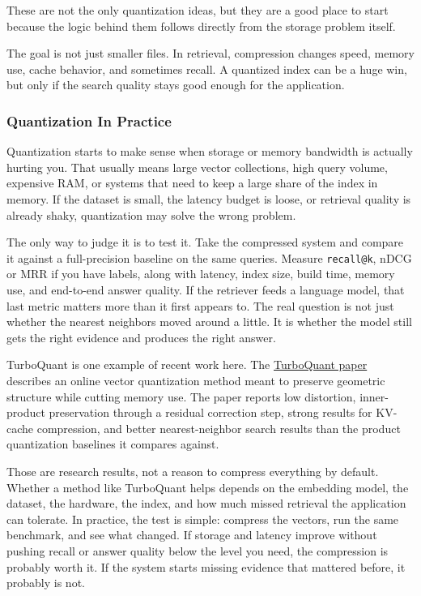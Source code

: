 \documentclass[12pt]{article}
\begin{document}
These are not the only quantization ideas, but they are a good place to
start because the logic behind them follows directly from the storage
problem itself.

The goal is not just smaller files. In retrieval, compression changes
speed, memory use, cache behavior, and sometimes recall. A quantized index
can be a huge win, but only if the search quality stays good enough for
the application.

\subsubsection{Quantization In Practice}

Quantization starts to make sense when storage or memory bandwidth is
actually hurting you. That usually means large vector collections, high
query volume, expensive RAM, or systems that need to keep a large share
of the index in memory. If the dataset is small, the latency budget is
loose, or retrieval quality is already shaky, quantization may solve the
wrong problem.

The only way to judge it is to test it. Take the compressed system and
compare it against a full-precision baseline on the same queries. Measure
\texttt{recall@k}, nDCG or MRR if you have labels, along with latency,
index size, build time, memory use, and end-to-end answer quality. If the
retriever feeds a language model, that last metric matters more than it
first appears to. The real question is not just whether the nearest
neighbors moved around a little. It is whether the model still gets the
right evidence and produces the right answer.

TurboQuant is one example of recent work here. The
\href{https://arxiv.org/abs/2504.19874}{TurboQuant paper} describes an
online vector quantization method meant to preserve geometric structure
while cutting memory use. The paper reports low distortion,
inner-product preservation through a residual correction step, strong
results for KV-cache compression, and better nearest-neighbor search
results than the product quantization baselines it compares against.

Those are research results, not a reason to compress everything by
default. Whether a method like TurboQuant helps depends on the embedding
model, the dataset, the hardware, the index, and how much missed
retrieval the application can tolerate. In practice, the test is simple:
compress the vectors, run the same benchmark, and see what changed. If
storage and latency improve without pushing recall or answer quality below
the level you need, the compression is probably worth it. If the system
starts missing evidence that mattered before, it probably is not.
\end{document}
